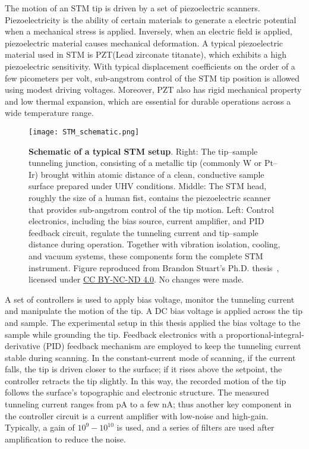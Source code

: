 The motion of an STM tip is driven by a set of piezoelectric scanners. Piezoelectricity is the ability of certain materials to generate a electric potential when a mechanical stress is applied. Inversely, when an electric field is applied, piezoelectric material causes mechanical deformation. A typical piezoelectric material used in STM is PZT(Lead zirconate titanate), which exhibits a high piezoelectric sensitivity. With typical displacement coefficients on the order of a few picometers per volt, sub-angstrom control of the STM tip position is allowed using modest driving voltages. Moreover, PZT also has rigid mechanical property and low thermal expansion, which are essential for durable operations across a wide temperature range.
 \begin{figure}
 	\centering
 	\texttt{[image: STM\_schematic.png]}
 	\caption[\textbf{Schematic of a typical STM setup}]{\textbf{Schematic of a typical STM setup}. 
			Right: The tip–sample tunneling junction, consisting of a metallic tip (commonly W or Pt–Ir) brought within atomic distance of a clean, conductive sample surface prepared under UHV conditions. 
 			Middle: The STM head, roughly the size of a human fist, contains the piezoelectric scanner that provides sub-angstrom control of the tip motion. 
 			Left: Control electronics, including the bias source, current amplifier, and PID feedback circuit, regulate the tunneling current and tip–sample distance during operation. 
 			Together with vibration isolation, cooling, and vacuum systems, these components form the complete STM instrument. 
 			Figure reproduced from Brandon Stuart's Ph.D. thesis~\cite{stuartScanningTunnellingMicroscopy2021}, licensed under  \href{https://creativecommons.org/licenses/by-nc-nd/4.0/}{CC BY-NC-ND 4.0}. No changes were made.
 	}
 	\label{fig:stm_schematics}
 \end{figure}
 
A set of controllers is used to apply bias voltage, monitor the tunneling current and manipulate the motion of the tip. A DC bias voltage is applied across the tip and sample. The experimental setup in this thesis applied the bias voltage to the sample while grounding the tip. Feedback electronics with a proportional-integral-derivative (PID) feedback mechanism are employed to keep the tunneling current stable during scanning. In the constant-current mode of scanning, if the current falls, the tip is driven closer to the surface; if it rises above the setpoint, the controller retracts the tip slightly. In this way, the recorded motion of the tip follows the surface's topographic and electronic structure. The measured tunneling current ranges from pA to a few nA; thus another key component in the controller circuit is a current amplifier with low-noise and high-gain. Typically, a gain of $10^9-10^{10}$ is used, and a series of filters are used after amplification to reduce the noise. 

